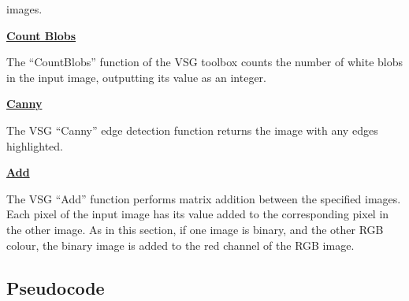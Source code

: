 \documentclass[a4paper]{article}
\begin{document}
	images.
	\par\underline{\textbf{Count Blobs}}
	\par The ``CountBlobs'' function of the VSG toolbox counts the number of
	white blobs in the input image, outputting its value as an integer.
	\par\underline{\textbf{Canny}}
	\par The VSG ``Canny'' edge detection function returns the image with
	any edges highlighted.
	\par\underline{\textbf{Add}}
	\par The VSG ``Add'' function performs matrix addition between the
	specified images. Each pixel of the input image has its value added to
	the corresponding pixel in the other image. As in this section, if one
	image is binary, and the other RGB colour, the binary image is added to
	the red channel of the RGB image.
	\subsection{Pseudocode}
\end{document}
